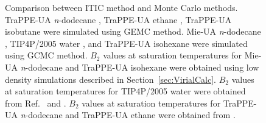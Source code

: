 \documentclass[5p,times]{elsarticle}
\begin{document}
\begin{figure}
\caption{
Comparison between ITIC method and Monte Carlo methods.
TraPPE-UA \textit{n}-dodecane \cite{Martin1998}, TraPPE-UA ethane \cite{Martin1998}, TraPPE-UA isobutane \cite{Wick2000} were simulated using GEMC method. Mie-UA \textit{n}-dodecane \cite{Potoff2009}, TIP4P/2005 water \cite{Shen2008}, and TraPPE-UA isohexane \cite{Mick2017} were simulated using GCMC method. $B_2$ values at saturation temperatures for Mie-UA \textit{n}-dodecane and TraPPE-UA isohexane were obtained using low density simulations described in Section~\ref{sec:VirialCalc}. $B_2$ values at saturation temperatures for TIP4P/2005 water were obtained from Ref.~\cite{Benjamin2007} and \citep{Chialvo2006}. $B_2$ values at saturation temperatures for TraPPE-UA \textit{n}-dodecane \cite{Martin1998} and TraPPE-UA ethane were obtained from \cite{Schultz2010a}.}
\label{fig:EXAMPLE-SIM/all}
\end{figure}
\end{document}
